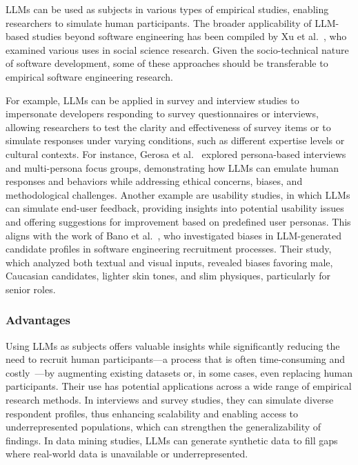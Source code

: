 LLMs can be used as subjects in various types of empirical studies, enabling researchers to simulate human participants.
The broader applicability of LLM-based studies beyond software engineering has been compiled by Xu et al.~\cite{DBLP:journals/ipm/XuSRGPLSH24}, who examined various uses in social science research.
Given the socio-technical nature of software development, some of these approaches should be transferable to empirical software engineering research.

For example, LLMs can be applied in survey and interview studies to impersonate developers responding to survey questionnaires or interviews, allowing researchers to test the clarity and effectiveness of survey items or to simulate responses under varying conditions, such as different expertise levels or cultural contexts. For instance, Gerosa et al.~\cite{DBLP:journals/ase/GerosaTSS24} explored persona-based interviews and multi-persona focus groups, demonstrating how LLMs can emulate human responses and behaviors while addressing ethical concerns, biases, and methodological challenges.
Another example are usability studies, in which LLMs can simulate end-user feedback, providing insights into potential usability issues and offering suggestions for improvement based on predefined user personas. This aligns with the work of Bano et al.~\cite{bano2025doessoftwareengineerlook}, who investigated biases in LLM-generated candidate profiles in software engineering recruitment processes. Their study, which analyzed both textual and visual inputs, revealed biases favoring male, Caucasian candidates, lighter skin tones, and slim physiques, particularly for senior roles.

\subsubsection{Advantages}

Using LLMs as subjects offers valuable insights while significantly reducing the need to recruit human participants—a process that is often time-consuming and costly~\cite{DBLP:conf/vl/Madampe0HO24}—by augmenting existing datasets or, in some cases, even replacing human participants. 
Their use has potential applications across a wide range of empirical research methods.
In interviews and survey studies, they can simulate diverse respondent profiles, thus enhancing scalability and enabling access to underrepresented populations, which can strengthen the generalizability of findings. 
In data mining studies, LLMs can generate synthetic data to fill gaps where real-world data is unavailable or underrepresented.

